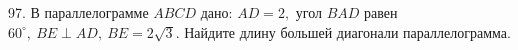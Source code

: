 97. В параллелограмме $ABCD$ дано: $AD=2,$ угол $BAD$ равен $60^\circ,\ BE\perp AD,\ BE=2\sqrt{3}.$ Найдите длину большей диагонали параллелограмма.\\

